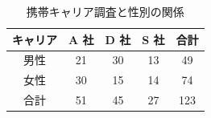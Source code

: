 \begin{table}[ht]
	\centering
	\caption{携帯キャリア調査と性別の関係}
	\begin{tabular}{c|ccc|c}
		キャリア & A 社 & D 社 & S 社 & 合計  \\\hline
		男性   & 21  & 30  & 13  & 49  \\
		女性   & 30  & 15  & 14  & 74  \\\hline
		合計   & 51  & 45  & 27  & 123 \\
	\end{tabular}
	\label{tbl:23_02}
\end{table}
